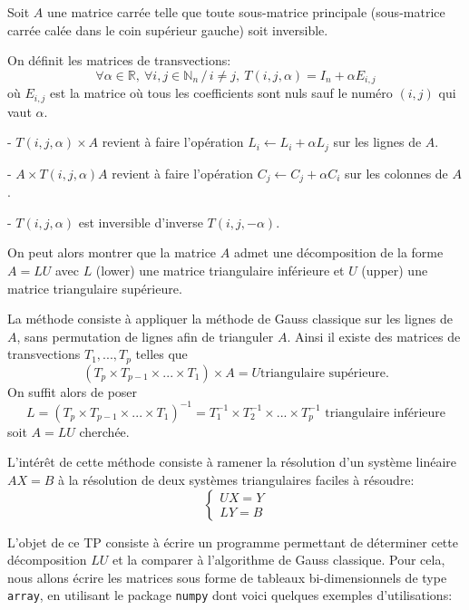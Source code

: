 \vskip1cm

Soit $A$ une matrice carrée telle que toute sous-matrice principale (sous-matrice carrée calée dans le coin supérieur gauche) soit inversible.

On définit les matrices de transvections: $$\forall \alpha\in {\mathbb R},\ \forall i,j\in {\mathbb N}_n\,/\,  i\ne j , \ T(i,j,\alpha)=I_n+\alpha E_{i,j}$$
où $E_{i,j}$ est la matrice où tous les coefficients sont nuls sauf le numéro $(i,j)$ qui vaut $\alpha$.

\medskip 


- $T(i,j,\alpha)\times A$ revient à faire l'opération $L_i\leftarrow L_i+\alpha L_j$ sur les lignes de $A$.

- $A\times T(i,j,\alpha)A$ revient à faire l'opération $C_j\leftarrow C_j+\alpha C_i$ sur les colonnes de $A$.

- $T(i,j,\alpha)$ est inversible d'inverse $T(i,j,-\alpha)$.

\medskip 

On peut alors montrer que la matrice $A$ admet une décomposition de la forme $A=LU$ avec $L$ (lower) une matrice triangulaire inférieure et $U$ (upper) une matrice triangulaire supérieure.

\medskip 

La méthode consiste à appliquer la méthode de Gauss classique sur les lignes de $A$, sans permutation de lignes afin de trianguler $A$. Ainsi il existe des matrices de transvections $T_1,...,T_p$ telles que $$(T_p\times T_{p-1}\times ...\times T_1)\times A=U \textrm{triangulaire supérieure}.$$
On suffit alors de poser $$L=(T_p\times T_{p-1}\times ...\times T_1)^{-1}=T_1^{-1}\times T_2^{-1}\times ...\times T_p^{-1} \textrm{ triangulaire inférieure}$$ soit $A=LU$ cherchée.

\medskip L'intérêt de cette méthode consiste à ramener la résolution d'un système linéaire $AX=B$ à la résolution de deux systèmes triangulaires faciles à résoudre: $$\left\{\begin{array}{l}UX=Y\\LY=B\end{array}\right.$$

\vskip1cm

L'objet de ce TP consiste à écrire un programme permettant de déterminer cette décomposition $LU$ et la comparer à l'algorithme de Gauss classique.
Pour cela, nous allons écrire les matrices sous forme de tableaux bi-dimensionnels de type \texttt{array}, en utilisant le package \texttt{numpy} dont voici quelques exemples d'utilisations:

